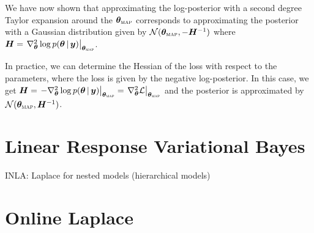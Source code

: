 We have now shown that approximating the log-posterior with a second degree Taylor expansion around the \(\bm\theta_{\textsc{map}}\) corresponds to approximating the posterior with a Gaussian distribution given by \(\mathcal{N}(\bm \theta_{\textsc{map}}, - \bm H^{-1})\) where \(\bm H = \left.\nabla^2_{\bm \theta} \log p(\bm \theta \, | \, \bm y) \right|_{\bm \theta_{\textsc{map}}}\).

In practice, we can determine the Hessian of the loss with respect to the parameters, where the loss is given by the negative log-posterior.
In this case, we get \(\bm H = \left. - \nabla^2_{\bm \theta} \log p(\bm \theta \, | \, \bm y) \right|_{\bm \theta_{\textsc{map}}} = \left. \nabla^2_{\bm \theta} \mathcal{L} \right|_{\bm \theta_{\textsc{map}}}\) and the posterior is approximated by \(\mathcal{N}(\bm \theta_{\textsc{map}}, \bm H^{-1})\).

\section{Linear Response Variational Bayes}


\cite{giordano2018covariances}

INLA: Laplace for nested models (hierarchical models)
\cite{rue2017bayesian}

\section{Online Laplace}

\cite{miani2022laplacian}



